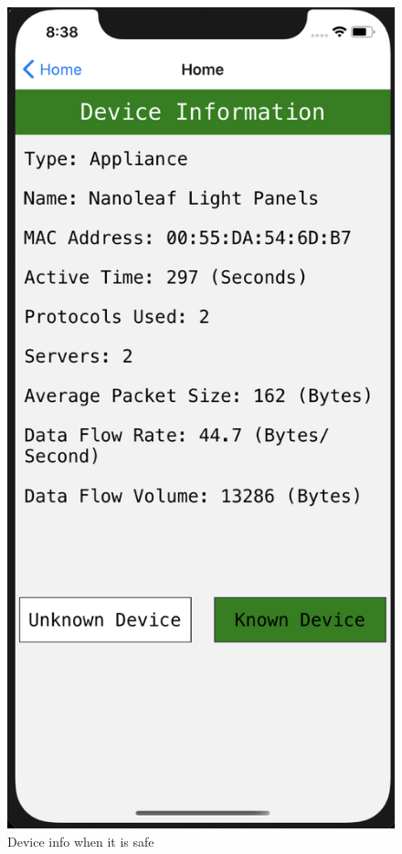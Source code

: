 \documentclass{article}
\begin{document}
\begin{figure}[!ht]
    \centering
    \includegraphics[scale=0.65]{frontEnd/deviceInfoSafe.png}
    \caption{Device info when it is safe} 
\end{figure}
\pagebreak
\end{document}
